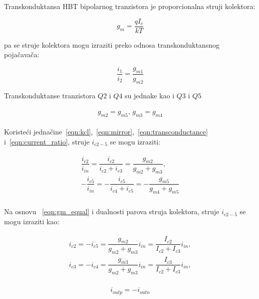\documentclass[journal,twocolumn,letterpaper]{IEEEJERM}
\begin{document}
Transkonduktansa HBT bipolarnog tranzistora je proporcionalna struji kolektora:

\begin{equation}
  \label{eqn:transconductance}
  g_{m} = \dfrac{qI_c}{kT}
\end{equation}

pa se struje kolektora mogu izraziti preko odnosa transkonduktansnog pojačavača:

\begin{equation}
  \label{eqn:current_ratio}
  \dfrac{i_1}{i_2} = \dfrac{g_{m1}}{g_{m2}}
\end{equation}

Transkonduktanse tranzistora $Q2$ i $Q4$ su jednake kao i $Q3$ i $Q5$

\begin{align}
  \label{eqn:gm_equal}
  \begin{split}
     g_{m2} = g_{m5}, \,
     g_{m3} = g_{m4}
  \end{split}
\end{align}


Koristeći jednačine~\eqref{eqn:kcl},~\eqref{eqn:mirror},~\eqref{eqn:transconductance} i~\eqref{eqn:current_ratio}, struje $i_{c2-5}$ se mogu izraziti:

\begin{align}
  \label{eqn:deriv2}
  \begin{split}
    \dfrac{i_{c2}}{i_{in}} = \dfrac{i_{c2}}{i_{c2} + i_{c3}} = \dfrac{g_{m2}}{g_{m2} + g_{m3}}, \\
    -\dfrac{i_{c5}}{i_{in}} = -\dfrac{i_{c5}}{i_{c4} + i_{c5}} = -\dfrac{g_{m5}}{g_{m4} + g_{m5}} \\
  \end{split}
\end{align}

Na osnovu ~\eqref{eqn:gm_equal} i dualnosti parova struja kolektora, struje $i_{c2-5}$ se mogu izraziti kao:

\begin{align}
  \label{eqn:deriv3}
  \begin{split}
    i_{c2} = -i_{c5} = \dfrac{g_{m2}}{g_{m2} + g_{m3}} i_{in} = \dfrac{I_{c2}}{I_{c2} + I_{c3}} i_{in}, \\
    i_{c3} = -i_{c4} = \dfrac{g_{m3}}{g_{m2} + g_{m3}} i_{in} = \dfrac{I_{c3}}{I_{c2} + I_{c3}} i_{in}, \\
  \end{split}
\end{align}

\begin{equation*}
  \label{eqn:out_current}
    i_{outp} = - i_{outn} 
\end{equation*}
\end{document}
